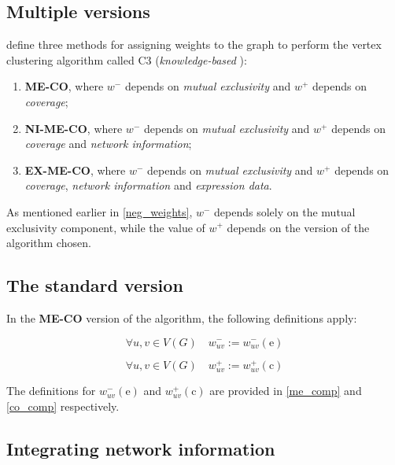 \subsection{Multiple versions}

\textcite{c3} define three methods for assigning weights to the graph to perform the vertex clustering algorithm called C3 (\textit{knowledge-based} \cite{survey}):

\begin{enumerate}
    \item \textbf{ME-CO}, where $w^-$ depends on \textit{mutual exclusivity} and $w^+$ depends on \textit{coverage};
    \item \textbf{NI-ME-CO}, where $w^-$ depends on \textit{mutual exclusivity} and $w^+$ depends on \textit{coverage} and \textit{network information};
    \item \textbf{EX-ME-CO}, where $w^-$ depends on \textit{mutual exclusivity} and $w^+$ depends on \textit{coverage}, \textit{network information} and \textit{expression data}.
\end{enumerate}

As mentioned earlier in \cref{neg_weights}, $w^-$ depends solely on the mutual exclusivity component, while the value of $w^+$ depends on the version of the algorithm chosen.

\subsection{The standard version}

\begin{definition}[ME-CO]
    In the \textbf{ME-CO} version of the algorithm, the following definitions apply:

    \begin{equation}
        \forall u, v \in V(G) \quad w_{uv}^- := w^-_{uv}(\mathrm e)
    \end{equation}

    \begin{equation}
        \forall u, v \in V(G) \quad w_{uv}^+ := w^+_{uv}(\mathrm c)
    \end{equation}
\end{definition}

The definitions for $w_{uv}^-(\mathrm e)$ and $w_{uv}^+(\mathrm c)$ are provided in \cref{me_comp} and \cref{co_comp} respectively. 

\subsection{Integrating network information}

